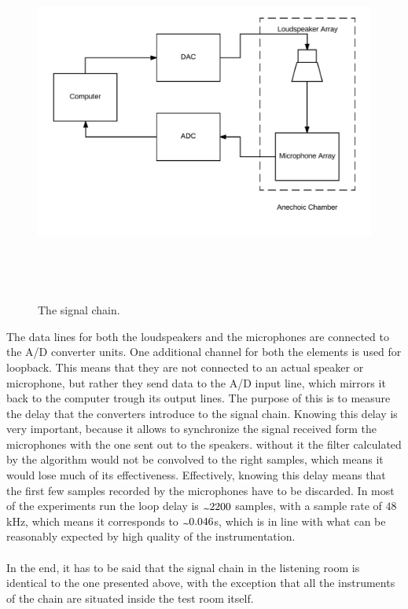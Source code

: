 \begin{figure}[H]
\centering
\includegraphics[width=12cm,height=12cm,keepaspectratio]{Figures/signalchain}
\decoRule
\caption[Signal Chain]{The signal chain.}
\label{fig:signalchain}
\end{figure}

The data lines for both the loudspeakers and the microphones are connected to the A/D converter units. One additional channel for both the elements is used for loopback. This means that they are not connected to an actual speaker or microphone, but rather they send data to the A/D input line, which mirrors it back to the computer trough its output lines. The purpose of this is to measure the delay that the converters introduce to the signal chain. Knowing this delay is very important, because it allows to synchronize the signal received form the microphones with the one sent out to the speakers. without it the filter calculated by the algorithm would not be convolved to the right samples, which means it would lose much of its effectiveness. Effectively, knowing this delay means that the first few samples recorded by the microphones have to be discarded. In most of the experiments run the loop delay is $\tld2200$ samples, with a sample rate of $48$kHz, which means it corresponds to $\tld0.046$s, which is in line with what can be reasonably expected by high quality of the instrumentation.
\\
\\
In the end, it has to be said that the signal chain in the listening room is identical to the one presented above, with the exception that all the instruments of the chain are situated inside the test room itself.
